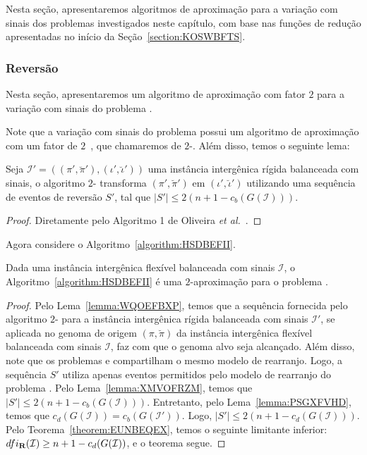 Nesta seção, apresentaremos algoritmos de aproximação para a variação com sinais dos problemas investigados neste capítulo, com base nas funções de redução apresentadas no início da Seção~\ref{section:KOSWBFTS}.

\subsubsection{Reversão}

Nesta seção, apresentaremos um algoritmo de aproximação com fator $2$ para a variação com sinais do problema \SbFIR{}. 

Note que a variação com sinais do problema \SbIR{} possui um algoritmo de aproximação com um fator de $2$~\cite{2021a-oliveira-etal}, que chamaremos de $2$-\SbIR{}. Além disso, temos o seguinte lema:

\begin{lemma}\label{lemma:XMVOFRZM}
Seja $\mathcal{I}' = ((\pi',\breve\pi'),(\iota',\breve\iota'))$ uma instância intergênica rígida balanceada com sinais, o algoritmo $2$-\SbIR{} transforma $(\pi',\breve\pi')$ em $(\iota',\breve\iota')$ utilizando uma sequência de eventos de reversão $S'$, tal que $|S'| \le 2({n+1} - c_b(G(\mathcal{I})))$.
\end{lemma}
\begin{proof}
Diretamente pelo Algoritmo 1 de Oliveira \textit{et al.}~\cite{2021b-oliveira-etal}.
\end{proof}

Agora considere o Algoritmo~\ref{algorithm:HSDBEFII}.



\begin{theorem}\label{theorem:GTWKCOJR}
Dada uma instância intergênica flexível balanceada com sinais $\mathcal{I}$, o Algoritmo~\ref{algorithm:HSDBEFII} é uma $2$-aproximação para o problema \SbFIR{}.
\end{theorem}
\begin{proof}
Pelo Lema~\ref{lemma:WQOEFBXP}, temos que a sequência fornecida pelo algoritmo $2$-\SbIR{} para a instância intergênica rígida balanceada com sinais $\mathcal{I'}$, se aplicada no genoma de origem $(\pi,\breve\pi)$ da instância intergênica flexível balanceada com sinais $\mathcal{I}$, faz com que o genoma alvo seja alcançado. Além disso, note que os problemas \SbIR{} e \SbFIR{} compartilham o mesmo modelo de rearranjo. Logo, a sequência $S'$ utiliza apenas eventos permitidos pelo modelo de rearranjo do problema \SbFIR{}. Pelo Lema~\ref{lemma:XMVOFRZM}, temos que $|S'| \le 2({n+1} - c_b(G(\mathcal{I})))$. Entretanto, pelo Lema~\ref{lemma:PSGXFVHD}, temos que $c_d(G(\mathcal{I})) = c_b(G(\mathcal{I}'))$. Logo, $|S'| \le 2({n+1} - c_d(G(\mathcal{I})))$. Pelo Teorema~\ref{theorem:EUNBEQEX}, temos o seguinte limitante inferior: $dfi_{\textbf{R}}(\mathcal{I}) \ge {n+1} - c_d(G(\mathcal{I}))$, e o teorema segue.
\end{proof}

